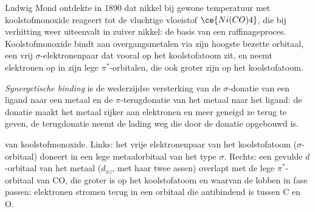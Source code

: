 Ludwig Mond ontdekte in 1890 dat nikkel bij gewone temperatuur met
koolstofmonoxide reageert tot de vluchtige vloeistof $\ce{Ni(CO)4}$, die bij verhitting weer uiteenvalt in zuiver
nikkel: de basis van een raffinageproces. Koolstofmonoxide bindt aan
overgangsmetalen via zijn hoogste bezette orbitaal, een vrij $\sigma$-elektronenpaar dat
vooral op het koolstofatoom zit, en neemt elektronen op in zijn lege $\pi^*$-orbitalen, die ook
groter zijn op het koolstofatoom.

\begin{definition}\label{def:b3:organometallic-bonding:synergic}
\emph{Synergetische binding} is de wederzijdse
versterking van de
$\sigma$-donatie van een ligand naar een metaal en de $\pi$-terugdonatie van het metaal naar het
ligand: de donatie maakt het metaal rijker aan elektronen en meer
geneigd ze terug te geven, de terugdonatie neemt de lading weg die door
de donatie opgebouwd is.
\end{definition}

\begin{omfigure}

{\small {} van koolstofmonoxide. Links: het vrije
elektronenpaar van het koolstofatoom ($\sigma$-orbitaal)
doneert in een lege metaalorbitaal van het type $\sigma$. Rechts: een gevulde $d$-orbitaal van het metaal
($d_{xz}$, met haar twee assen) overlapt met de lege $\pi^*$-orbitaal van CO, die groter is op het
koolstofatoom en waarvan de lobben in fase passen: elektronen stromen
terug in een orbitaal die
antibindend is tussen C en O.}
\end{omfigure}

